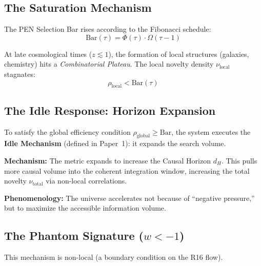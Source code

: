 \documentclass[11pt,a4paper]{article}
\theoremstyle{definition}
\theoremstyle{plain}
\theoremstyle{remark}
\newcommand{\eff}{\rho}
\newcommand{\novelty}{\nu}
\newcommand{\SelectionBar}{\mathrm{Bar}}
\begin{document}
\subsection{The Saturation Mechanism}

The PEN Selection Bar rises according to the Fibonacci schedule:
\begin{equation}
    \SelectionBar(\tau) = \Phi(\tau) \cdot \Omega(\tau-1)
\end{equation}

At late cosmological times ($z \lesssim 1$), the formation of local structures (galaxies, chemistry) hits a \emph{Combinatorial Plateau}. The local novelty density $\novelty_{\mathrm{local}}$ stagnates:
\begin{equation}
    \eff_{\mathrm{local}} < \SelectionBar(\tau)
\end{equation}

\subsection{The Idle Response: Horizon Expansion}

To satisfy the global efficiency condition $\eff_{\mathrm{global}} \ge \SelectionBar$, the system executes the \textbf{Idle Mechanism} (defined in Paper~1): it expands the search volume.

\textbf{Mechanism:} The metric expands to increase the Causal Horizon $d_H$. This pulls more causal volume into the coherent integration window, increasing the total novelty $\novelty_{\mathrm{total}}$ via non-local correlations.

\textbf{Phenomenology:} The universe accelerates not because of ``negative pressure,'' but to maximize the accessible information volume.

\subsection{The Phantom Signature (\texorpdfstring{$w < -1$}{w < -1})}

This mechanism is non-local (a boundary condition on the R16 flow).
\end{document}
